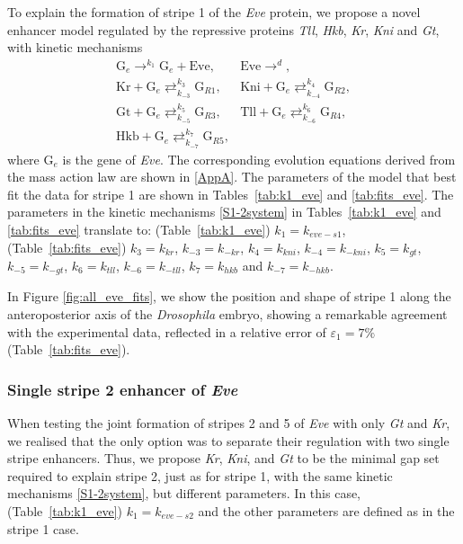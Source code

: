 \documentclass[final,authoryear, 5p, times]{elsarticle}
\begin{document}
To explain the formation of stripe 1 of the \textit{Eve} protein, we propose a novel enhancer model regulated by the repressive proteins \textit{Tll}, \textit{Hkb}, \textit{Kr}, \textit{Kni} and \textit{Gt}, with kinetic mechanisms
\begin{equation} \label{S1-2system}
    \begin{array}{ll}
        \displaystyle
        \text{G}_e \mathop{\longrightarrow}^{k_{1}} \text{G}_e + \text{Eve}, & \displaystyle
        \text{Eve} \mathop{\longrightarrow}^{d}, \\ \displaystyle
        \text{Kr} + \text{G}_e \mathop{\rightleftarrows}^{k_{3}}_{k_{-3}} \text{G}_{R1}, & \displaystyle
        \text{Kni} + \text{G}_e \mathop{\rightleftarrows}^{k_{4}}_{k_{-4}} \text{G}_{R2},\\ \displaystyle
        \text{Gt} + \text{G}_e \mathop{\rightleftarrows}^{k_{5}}_{k_{-5}} \text{G}_{R3}, & \displaystyle
        \text{Tll} + \text{G}_e \mathop{\rightleftarrows}^{k_{6}}_{k_{-6}} \text{G}_{R4}, \\ \displaystyle
        \text{Hkb} + \text{G}_e \mathop{\rightleftarrows}^{k_{7}}_{k_{-7}} \text{G}_{R5}, &
    \end{array}
\end{equation} 
where $\text{G}_e$ is the gene of  \textit{Eve}.
The corresponding evolution equations derived from the mass action law are shown in \ref{AppA}. The parameters of the model that best fit the data for stripe 1 are shown in Tables~\ref{tab:k1_eve} and \ref{tab:fits_eve}. 
The parameters in the kinetic mechanisms \eqref{S1-2system} in Tables~\ref{tab:k1_eve} and \ref{tab:fits_eve} translate to: (Table~\ref{tab:k1_eve}) $k_1=k_{eve-s1}$, (Table~\ref{tab:fits_eve}) $k_3=k_{kr}$, $k_{-3}=k_{-kr}$, $k_4= k_{kni}$, $k_{-4}=k_{-kni}$, $k_5=k_{gt}$, $k_{-5}=k_{-gt}$, $k_6=k_{tll}$, $k_{-6}=k_{-tll}$, $k_7=k_{hkb}$ and $k_{-7}=k_{-hkb}$.

In Figure \ref{fig:all_eve_fits}, we show the position and shape of stripe 1 along the anteroposterior axis of the \textit{Drosophila} embryo, showing a remarkable agreement with the experimental data, reflected in a relative error of   $\varepsilon_1=7\%$ (Table~\ref{tab:fits_eve}).

\subsubsection{Single stripe 2 enhancer of \textit{Eve}}

When testing the joint formation of stripes 2 and 5 of \textit{Eve} with only \textit{Gt} and \textit{Kr}, we realised that the only option was to separate their regulation with two single stripe enhancers. Thus, we propose \textit{Kr}, \textit{Kni}, and \textit{Gt} to be the minimal gap set required to explain stripe 2, just as for stripe 1, with the same kinetic mechanisms \eqref{S1-2system}, but different parameters. In this case, (Table~\ref{tab:k1_eve}) $k_1=k_{eve-s2}$ and the other parameters are defined as in the stripe 1 case.
\end{document}
